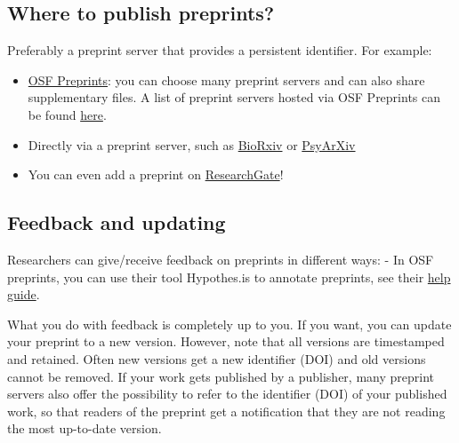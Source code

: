 \documentclass[
  letterpaper,
  DIV=11,
  numbers=noendperiod]{scrreprt}
\begin{document}
\hypertarget{where-to-publish-preprints}{%
\subsection*{\texorpdfstring{\textbf{Where to publish
preprints?}}{Where to publish preprints?}}\label{where-to-publish-preprints}}

Preferably a preprint server that provides a persistent identifier. For
example:

\begin{itemize}
\item
  \href{https://osf.io/preprints/}{OSF Preprints}: you can choose many
  preprint servers and can also share supplementary files. A list of
  preprint servers hosted via OSF Preprints can be found
  \href{https://osf.io/preprints/discover?subject=bepress\%7CSocial\%20and\%20Behavioral\%20Sciences}{here}.
\item
  Directly via a preprint server, such as
  \href{https://www.biorxiv.org/}{BioRxiv} or
  \href{https://psyarxiv.com/}{PsyArXiv}
\item
  You can even add a preprint on
  \href{https://explore.researchgate.net/display/support/Preprints}{ResearchGate}!
\end{itemize}

\hypertarget{feedback-and-updating}{%
\subsection*{\texorpdfstring{\textbf{Feedback and
updating}}{Feedback and updating}}\label{feedback-and-updating}}

Researchers can give/receive feedback on preprints in different ways: -
In OSF preprints, you can use their tool Hypothes.is to annotate
preprints, see their
\href{https://help.osf.io/hc/en-us/articles/360019738554-annotate-a-preprint}{help
guide}.

What you do with feedback is completely up to you. If you want, you can
update your preprint to a new version. However, note that all versions
are timestamped and retained. Often new versions get a new identifier
(DOI) and old versions cannot be removed. If your work gets published by
a publisher, many preprint servers also offer the possibility to refer
to the identifier (DOI) of your published work, so that readers of the
preprint get a notification that they are not reading the most
up-to-date version.
\end{document}
